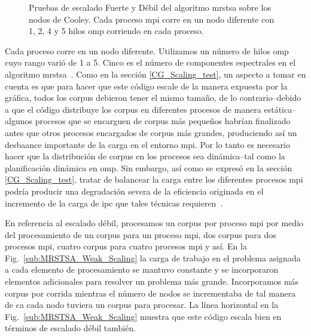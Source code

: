 {\begin{figure}[tb]
    \hfill
	\caption{Pruebas de escalado Fuerte y Débil del algoritmo \gls{mrstsa} sobre los nodos de Cooley. Cada proceso \gls{mpi} corre en un nodo diferente con 1, 2, 4 y 5 hilos \gls{omp} corriendo en cada proceso.}
  \label{fig:MRSTSA_Scaling} 
\end{figure}

Cada proceso corre en un nodo diferente. Utilizamos un número de hilos \gls{omp} cuyo rango varió de 1 a 5.
Cinco es el número de componentes espectrales en el algoritmo \gls{mrstsa}~\cite{10.1371/journal.pone.0217966}.
Como en la sección \ref{CG_Scaling_test}, un aspecto a tomar en cuenta es que para hacer que este código escale de la manera expuesta por la gráfica, todos los corpus debieron tener el mismo tamaño, de lo contrario--debido a que el código distribuye los corpus en diferentes procesos de manera estática--algunos procesos que se encarguen de corpus más pequeños habrían finalizado antes que otros procesos encargados de corpus más grandes, produciendo así un desbaance importante de la carga en el entorno \gls{mpi}.
Por lo tanto es necesario hacer que la distribución de corpus en los procesos sea dinámica--tal como la planificación dinámica en \gls{omp}.
Sin embargo, así como se expresó en la sección \ref{CG_Scaling_test}, tratar de balancear la carga entre los diferentes procesos \gls{mpi} podría producir una degradación severa de la eficiencia originada en el incremento de la carga de \gls{ipc} que tales técnicas requieren~\cite{hu2012biophysically}.

En referencia al escalado débil, procesamos un corpus por proceso \gls{mpi} por medio del procesamiento de un corpus para un proceso \gls{mpi}, dos corpus para dos procesos \gls{mpi}, cuatro corpus para cuatro procesos \gls{mpi} y así.
En la Fig.~\ref{sub:MRSTSA_Weak_Scaling} la carga de trabajo en el problema asignada a cada elemento de procesamiento se mantuvo constante y se incorporaron elementos adicionales para resolver un problema más grande.
Incorporamos más corpus por corrida mientras el número de nodos se incrementaba de tal manera de ca cada nodo tuviera un corpus para procesar.
La línea horizontal en la Fig.~\ref{sub:MRSTSA_Weak_Scaling} muestra que este código escala bien en términos de escalado débil también.

}
